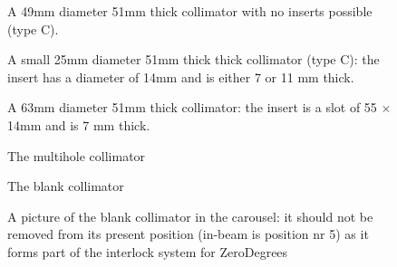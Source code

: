 \documentclass[11pt]{report}
\begin{document}
\begin{figure}[!ht]
\centerline{\vspace{0cm}\hspace{0cm}
}
\centering
\caption{A 49mm diameter 51mm thick collimator with no inserts possible (type C).}
\label{fig:solid49mm}
\end{figure} 

\begin{figure}[!ht]
\centerline{\vspace{0cm}\hspace{0cm}
}
\centering
\caption{A small 25mm diameter  51mm thick thick collimator (type C): 
the insert has a diameter of 14mm and is either 7 or 11 mm thick.}
\label{fig:14mm-hole-incoll}
\end{figure} 


\begin{figure}[!ht]
\centerline{\vspace{0cm}\hspace{0cm}
}
\centering
\caption{A 63mm diameter 51mm thick collimator: the insert is a slot of 55 $\times$ 14mm and is 7 mm thick.}
\label{fig:slot-55-14-in63mmcoll}
\end{figure} 

\begin{figure}[!ht]
\centerline{\vspace{0cm}\hspace{0cm}
}
\centering
\caption{The multihole collimator}
\label{fig:multihole.eps}
\end{figure} 
\clearpage


\begin{figure}[!ht]
\centerline{\vspace{0cm}\hspace{0cm}
}
\centering
\caption{The blank collimator}
\label{fig:collimator-blank}
\end{figure} 

\begin{figure}[!ht]
\centerline{\vspace{0cm}\hspace{0cm}
}
\centering
\caption{A picture of the blank collimator in the carousel: it should not be removed from its
present position (in-beam is position nr 5) as it forms part of the interlock system for ZeroDegrees}
\label{fig:collimator-blank}
\end{figure} 
\end{document}
